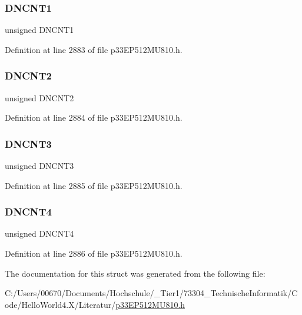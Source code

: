 \subsubsection{\texorpdfstring{D\+N\+C\+N\+T1}{DNCNT1}}
{\footnotesize\ttfamily unsigned D\+N\+C\+N\+T1}



Definition at line 2883 of file p33\+E\+P512\+M\+U810.\+h.

\mbox{\label{structtag_c1_c_t_r_l2_b_i_t_s_a1a347041cec37b585f3e4809f26e742b}} 
\subsubsection{\texorpdfstring{D\+N\+C\+N\+T2}{DNCNT2}}
{\footnotesize\ttfamily unsigned D\+N\+C\+N\+T2}



Definition at line 2884 of file p33\+E\+P512\+M\+U810.\+h.

\mbox{\label{structtag_c1_c_t_r_l2_b_i_t_s_aefe3e090728f03e982e016058f54196e}} 
\subsubsection{\texorpdfstring{D\+N\+C\+N\+T3}{DNCNT3}}
{\footnotesize\ttfamily unsigned D\+N\+C\+N\+T3}



Definition at line 2885 of file p33\+E\+P512\+M\+U810.\+h.

\mbox{\label{structtag_c1_c_t_r_l2_b_i_t_s_afeca93a17ca8b9136cf43834d3c30f1e}} 
\subsubsection{\texorpdfstring{D\+N\+C\+N\+T4}{DNCNT4}}
{\footnotesize\ttfamily unsigned D\+N\+C\+N\+T4}



Definition at line 2886 of file p33\+E\+P512\+M\+U810.\+h.



The documentation for this struct was generated from the following file\+:\begin{DoxyCompactItemize}
\item 
C\+:/\+Users/00670/\+Documents/\+Hochschule/\+\_\+\+Tier1/73304\+\_\+\+Technische\+Informatik/\+Code/\+Hello\+World4.\+X/\+Literatur/\hyperlink{p33_e_p512_m_u810_8h}{p33\+E\+P512\+M\+U810.\+h}\end{DoxyCompactItemize}

